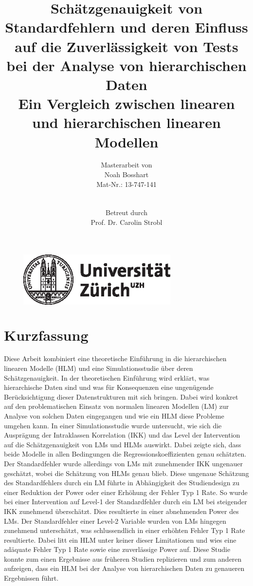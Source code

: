 \documentclass[12pt, a4paper]{article}\usepackage[]{graphicx}\usepackage[]{color}
\title{Schätzgenauigkeit von Standardfehlern und deren Einfluss auf die Zuverlässigkeit von Tests bei der Analyse von hierarchischen Daten \\ \large{Ein Vergleich zwischen linearen und hierarchischen linearen Modellen}}
\author{Masterarbeit von \\ Noah Bosshart \\ Mat-Nr.: 13-747-141 \\ \\ \\ Betreut durch \\ Prof. Dr. Carolin Strobl}
\begin{document}


\begin{figure}[t]
  \centering
  \includegraphics[width = 8cm]{./figures/uzh_logo.eps}
\end{figure}

\maketitle
\thispagestyle{empty}

\newpage
{}
\tableofcontents

\newpage
\listoffigures

\newpage
\listoftables
\newpage


\section*{Kurzfassung}
Diese Arbeit kombiniert eine theoretische Einführung in die hierarchischen linearen Modelle (HLM) und  eine Simulationsstudie über deren Schätzgenauigkeit. In der theoretischen Einführung wird erklärt, was hierarchische Daten sind und was für Konsequenzen eine ungenügende Berücksichtigung dieser Datenstrukturen mit sich bringen. Dabei wird konkret auf den problematischen Einsatz von normalen linearen Modellen (LM) zur Analyse von solchen Daten eingegangen und wie ein HLM diese Probleme umgehen kann. In einer Simulationsstudie wurde untersucht, wie sich die Ausprägung der Intraklassen Korrelation (IKK) und das Level der Intervention auf die Schätzgenauigkeit von LMs und HLMs auswirkt. Dabei zeigte sich, dass beide Modelle in allen Bedingungen die Regressionskoeffizienten genau schätzten. Der Standardfehler wurde allerdings von LMs mit zunehmender IKK ungenauer geschätzt, wobei die Schätzung von HLMs genau blieb. Diese ungenaue Schätzung des Standardfehlers durch ein LM führte in Abhängigkeit des Studiendesign zu einer Reduktion der Power oder einer Erhöhung der Fehler Typ 1 Rate. So wurde bei einer Intervention auf Level-1 der Standardfehler durch ein LM bei steigender IKK zunehmend überschätzt. Dies resultierte in einer abnehmenden Power des LMs. Der Standardfehler einer Level-2 Variable wurden von LMs hingegen zunehmend unterschätzt, was schlussendlich in einer erhöhten Fehler Typ 1 Rate resultierte. Dabei litt ein HLM unter keiner dieser Limitationen und wies eine adäquate Fehler Typ 1 Rate sowie eine zuverlässige Power auf. Diese Studie konnte zum einen Ergebnisse aus früheren Studien replizieren und zum anderen aufzeigen, dass ein HLM bei der Analyse von hierarchischen Daten zu genaueren Ergebnissen führt.
\end{document}
